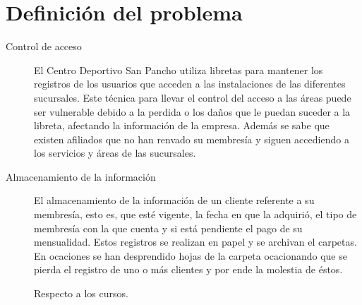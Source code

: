 \section{Definición del problema}

\begin{description}
	\item[Control de acceso] El Centro Deportivo San Pancho utiliza libretas para mantener los registros de los usuarios que acceden a las instalaciones de las diferentes sucursales. Este técnica para llevar el control del acceso a las áreas puede ser vulnerable debido a la perdida o los daños que le puedan suceder a la libreta, afectando la información de la empresa. Además se sabe que existen afiliados que no han renvado su membresía y siguen accediendo a los servicios y áreas de las sucursales.
	
	\item[Almacenamiento de la información]  El almacenamiento de la información de un cliente referente a su membresía, esto es, que esté vigente, la fecha en que la adquirió, el tipo de membresía con la que cuenta y si está pendiente el pago de su mensualidad. Estos registros se realizan en papel y se archivan el carpetas. En ocaciones se han desprendido hojas de la carpeta ocacionando que se pierda el registro de uno o más clientes y por ende la molestia de éstos.
	
	\item[] Respecto a los cursos. 
\end{description}












